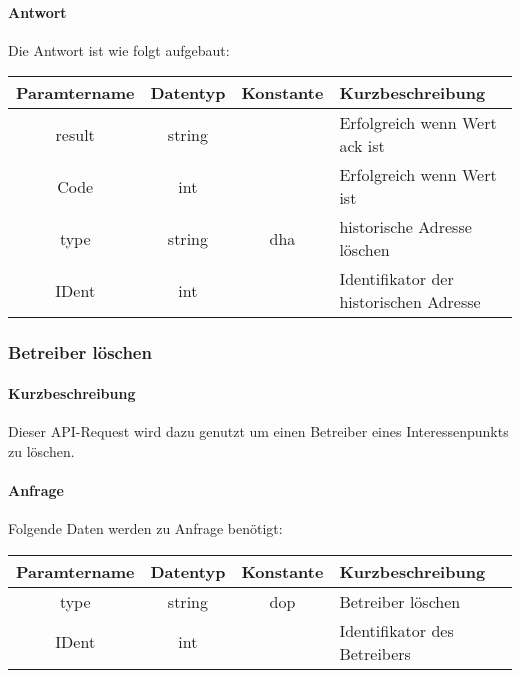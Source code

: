 \paragraph{Antwort}Die Antwort ist wie folgt aufgebaut:
\begin{table}[H]
	\begin{tabular}{|c|c|c|p{6.5cm}|}
		\hline
		\textbf{Paramtername} & \textbf{Datentyp} & \textbf{Konstante} & \textbf{Kurzbeschreibung}                                                                                               \\ \hline
		result              & string           &                 & Erfolgreich wenn Wert {\glqq ack\grqq} ist \\ \hline
		Code                & int              &                 & Erfolgreich wenn Wert {\glqq 0\grqq} ist \\ \hline
		type                & string           & dha             & historische Adresse löschen \\ \hline
		IDent               & int              &                 & Identifikator der historischen Adresse \\ \hline
	\end{tabular}
\end{table}
\subsubsection{Betreiber löschen}
\paragraph{Kurzbeschreibung}Dieser API-Request wird dazu genutzt um einen Betreiber eines Interessenpunkts zu löschen.
\paragraph{Anfrage}Folgende Daten werden zu Anfrage benötigt:
\begin{table}[H]
	\begin{tabular}{|c|c|c|p{6.5cm}|}
		\hline
		\textbf{Paramtername} & \textbf{Datentyp} & \textbf{Konstante} & \textbf{Kurzbeschreibung}                                                                                               \\ \hline
		type                & string            & dop                & Betreiber löschen \\ \hline
		IDent               & int               &                    & Identifikator des Betreibers \\ \hline
	\end{tabular}
\end{table}
